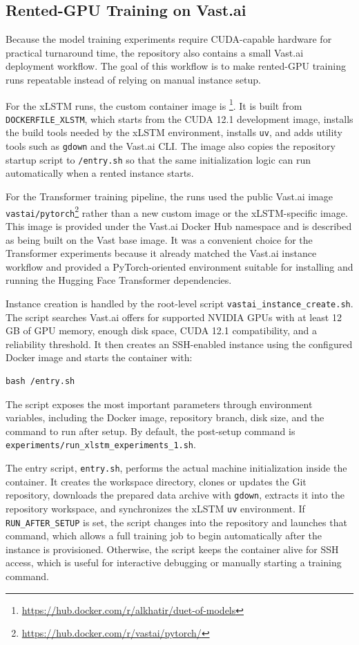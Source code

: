 \subsection{Rented-GPU Training on Vast.ai}

Because the model training experiments require CUDA-capable hardware for practical turnaround time, the repository also contains a small Vast.ai deployment workflow. The goal of this workflow is to make rented-GPU training runs repeatable instead of relying on manual instance setup.

For the xLSTM runs, the custom container image is \footnote{\url{https://hub.docker.com/r/alkhatir/duet-of-models}}. It is built from \verb|DOCKERFILE_XLSTM|, which starts from the CUDA 12.1 development image, installs the build tools needed by the xLSTM environment, installs \verb|uv|, and adds utility tools such as \verb|gdown| and the Vast.ai CLI. The image also copies the repository startup script to \verb|/entry.sh| so that the same initialization logic can run automatically when a rented instance starts.

For the Transformer training pipeline, the runs used the public Vast.ai image \verb|vastai/pytorch|\footnote{\url{https://hub.docker.com/r/vastai/pytorch/}} rather than a new custom image or the xLSTM-specific image. This image is provided under the Vast.ai Docker Hub namespace and is described as being built on the Vast base image. It was a convenient choice for the Transformer experiments because it already matched the Vast.ai instance workflow and provided a PyTorch-oriented environment suitable for installing and running the Hugging Face Transformer dependencies.

Instance creation is handled by the root-level script \verb|vastai_instance_create.sh|. The script searches Vast.ai offers for supported NVIDIA GPUs with at least 12 GB of GPU memory, enough disk space, CUDA 12.1 compatibility, and a reliability threshold. It then creates an SSH-enabled instance using the configured Docker image and starts the container with:
\begin{verbatim}
bash /entry.sh
\end{verbatim}
The script exposes the most important parameters through environment variables, including the Docker image, repository branch, disk size, and the command to run after setup. By default, the post-setup command is \verb|experiments/run_xlstm_experiments_1.sh|.

The entry script, \verb|entry.sh|, performs the actual machine initialization inside the container. It creates the workspace directory, clones or updates the Git repository, downloads the prepared data archive with \verb|gdown|, extracts it into the repository workspace, and synchronizes the xLSTM \verb|uv| environment. If \verb|RUN_AFTER_SETUP| is set, the script changes into the repository and launches that command, which allows a full training job to begin automatically after the instance is provisioned. Otherwise, the script keeps the container alive for SSH access, which is useful for interactive debugging or manually starting a training command.

